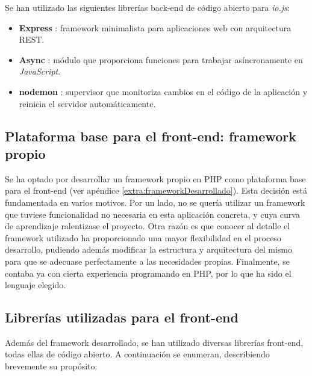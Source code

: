 Se han utilizado las siguientes librerías \gls{back-end} de código abierto para \textit{io.js}:

\begin{itemize}
  \item \textbf{Express} \cite{express}: \gls{framework} minimalista para aplicaciones web con arquitectura \gls{REST}.

  \item \textbf{Async} \cite{async}: módulo que proporciona funciones para trabajar asíncronamente en \textit{JavaScript}.

  \item \textbf{nodemon} \cite{nodemon}: supervisor que monitoriza cambios en el código de la aplicación y reinicia el servidor automáticamente.

\end{itemize}

\subsection*{Plataforma base para el \gls{front-end}: \gls{framework} propio\label{ssec:dp:front-end}}

Se ha optado por desarrollar un \gls{framework} propio en \gls{PHP} como plataforma base para el \gls{front-end} (ver apéndice \ref{extra:frameworkDesarrollado}).
Esta decisión está fundamentada en varios motivos.
Por un lado, no se quería utilizar un \gls{framework} que tuviese funcionalidad no necesaria en esta aplicación concreta, y cuya curva de aprendizaje ralentizase el proyecto.
Otra razón es que conocer al detalle el \gls{framework} utilizado ha proporcionado una mayor flexibilidad en el proceso desarrollo, pudiendo además modificar la estructura y arquitectura del mismo para que se adecuase perfectamente a las necesidades propias.
Finalmente, se contaba ya con cierta experiencia programando en \gls{PHP}, por lo que ha sido el lenguaje elegido.

\subsection*{Librerías utilizadas para el \gls{front-end}\label{ssec:dp:front-end-libs}}

Además del \gls{framework} desarrollado, se han utilizado diversas librerías \gls{front-end}, todas ellas de código abierto. A continuación se enumeran, describiendo brevemente su propósito:

